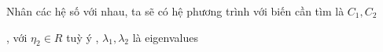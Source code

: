     Nhân các hệ số với nhau, ta sẽ có hệ phương trình với biến cần tìm là $C_1, C_2$
    \begin{center}
        , với $\eta_2 \in R$ tuỳ ý
        , $\lambda_1, \lambda_2$ là eigenvalues
    \end{center}



